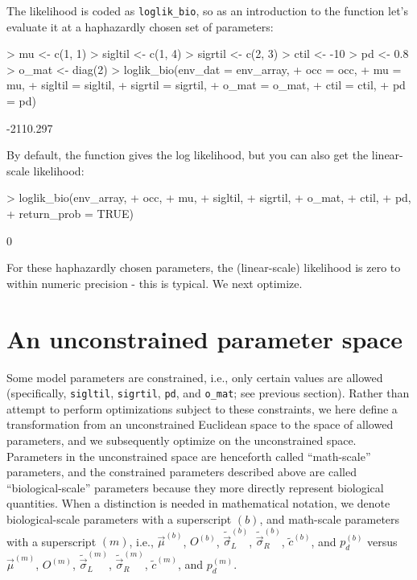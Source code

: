 \documentclass[11pt]{article}
\begin{document}
The likelihood is coded as \texttt{loglik\_bio}, so as an introduction to the function 
let's evaluate it at a haphazardly chosen set of parameters:
\begin{Schunk}
\begin{Sinput}
> mu <- c(1, 1)
> sigltil <- c(1, 4)
> sigrtil <- c(2, 3)
> ctil <- -10
> pd <- 0.8
> o_mat <- diag(2)
> loglik_bio(env_dat = env_array,
+            occ = occ,
+            mu = mu,
+            sigltil = sigltil,
+            sigrtil = sigrtil,
+            o_mat = o_mat,
+            ctil = ctil,
+            pd = pd)
\end{Sinput}
\begin{Soutput}
[1] -2110.297
\end{Soutput}
\end{Schunk}
\noindent By default, the function gives the log likelihood, but you can also get the linear-scale
likelihood:
\begin{Schunk}
\begin{Sinput}
> loglik_bio(env_array,
+            occ,
+            mu,
+            sigltil,
+            sigrtil,
+            o_mat,
+            ctil,
+            pd,
+            return_prob = TRUE)
\end{Sinput}
\begin{Soutput}
[1] 0
\end{Soutput}
\end{Schunk}
\noindent For these haphazardly chosen parameters, the (linear-scale) likelihood is zero to within 
numeric precision - this is typical. We next optimize.
 
\section{An unconstrained parameter space}
 
Some model parameters are constrained, i.e., only certain values are allowed (specifically, 
\texttt{sigltil}, \texttt{sigrtil}, \texttt{pd}, and \texttt{o\_mat}; see previous section). 
Rather than attempt to perform optimizations subject to these constraints, we 
here define a transformation from an unconstrained Euclidean space to 
the space of allowed parameters, and we subsequently optimize on the unconstrained space. 
Parameters in the unconstrained space are henceforth called
``math-scale'' parameters, and the constrained parameters described above are called 
``biological-scale'' parameters because they more directly represent biological quantities. 
When a distinction is needed in mathematical notation, we denote biological-scale parameters with a superscript
$(b)$, and math-scale parameters with a superscript $(m)$, i.e., $\vec{\mu}^{(b)}$, $O^{(b)}$, 
$\tilde{\vec{\sigma}}_L^{(b)}$,
$\tilde{\vec{\sigma}}_R^{(b)}$, $\tilde{c}^{(b)}$, and $p_d^{(b)}$ versus $\vec{\mu}^{(m)}$, $O^{(m)}$, 
$\tilde{\vec{\sigma}}_L^{(m)}$,
$\tilde{\vec{\sigma}}_R^{(m)}$, $\tilde{c}^{(m)}$, and $p_d^{(m)}$.
\end{document}
